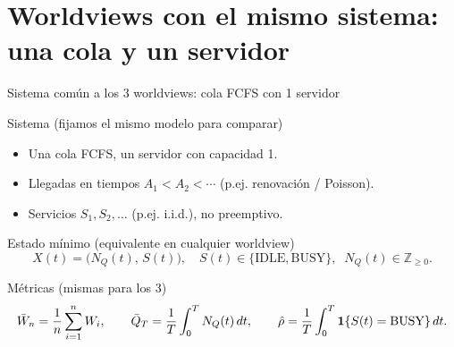 \documentclass[aspectratio=1610, 9pt]{beamer}
\begin{document}


\section{Worldviews con el mismo sistema: una cola y un servidor}

\begin{frame}{Sistema común a los 3 worldviews: cola FCFS con 1 servidor}
\small
\begin{block}{Sistema (fijamos el mismo modelo para comparar)}
\begin{itemize}
\item Una cola FCFS, un servidor con capacidad 1.
\item Llegadas en tiempos $A_1<A_2<\cdots$ (p.ej. renovación / Poisson).
\item Servicios $S_1,S_2,\dots$ (p.ej. i.i.d.), no preemptivo.
\end{itemize}
\end{block}

\vspace{4pt}
\begin{block}{Estado mínimo (equivalente en cualquier worldview)}
\[
X(t)=\big(N_Q(t),\, S(t)\big),\quad
S(t)\in\{\text{IDLE},\text{BUSY}\},\;\; N_Q(t)\in\mathbb{Z}_{\ge 0}.
\]
\end{block}

\vspace{4pt}
\begin{block}{Métricas (mismas para los 3)}
\[
\bar W_n=\frac{1}{n}\sum_{i=1}^n W_i,\qquad
\bar Q_T=\frac{1}{T}\int_0^T N_Q(t)\,dt,\qquad
\hat\rho=\frac{1}{T}\int_0^T \mathbf{1}\{S(t)=\text{BUSY}\}\,dt.
\]
\end{block}
\end{frame}
\end{document}
